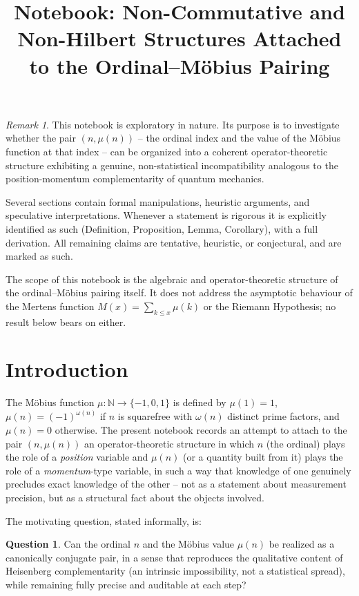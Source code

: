 \documentclass[11pt]{amsart}
\title{
Notebook:
Non-Commutative and Non-Hilbert Structures
Attached to the Ordinal--M\"obius Pairing
}
\author{}
\date{}
\numberwithin{equation}{section}
\theoremstyle{plain}
\theoremstyle{definition}
\newtheorem{question}[theorem]{Question}
\theoremstyle{remark}
\newtheorem{remark}[theorem]{Remark}
\newcommand{\N}{\mathbb{N}}
\begin{document}
\maketitle

\tableofcontents

\bigskip

\begin{remark}
\label{rem:exploratory_nature}
This notebook is exploratory in nature. Its purpose is to investigate
whether the pair $(n,\mu(n))$ -- the ordinal index and the value of
the M\"obius function at that index -- can be organized into a
coherent operator-theoretic structure exhibiting a genuine,
non-statistical incompatibility analogous to the position-momentum
complementarity of quantum mechanics.

Several sections contain formal manipulations, heuristic arguments,
and speculative interpretations. Whenever a statement is rigorous it
is explicitly identified as such (Definition, Proposition, Lemma,
Corollary), with a full derivation. All remaining claims are
tentative, heuristic, or conjectural, and are marked as such.

The scope of this notebook is the algebraic and operator-theoretic
structure of the ordinal--M\"obius pairing itself. It does not
address the asymptotic behaviour of the Mertens function $M(x)=\sum_{k\le x}\mu(k)$
or the Riemann Hypothesis; no result below bears on either.
\end{remark}

\section{Introduction}
\label{sec:introduction}

The M\"obius function $\mu:\N\to\{-1,0,1\}$ is defined by $\mu(1)=1$,
$\mu(n)=(-1)^{\omega(n)}$ if $n$ is squarefree with $\omega(n)$ distinct
prime factors, and $\mu(n)=0$ otherwise. The present notebook records
an attempt to attach to the pair $(n,\mu(n))$ an operator-theoretic
structure in which $n$ (the ordinal) plays the role of a
\emph{position} variable and $\mu(n)$ (or a quantity built from it)
plays the role of a \emph{momentum}-type variable, in such a way that
knowledge of one genuinely precludes exact knowledge of the other --
not as a statement about measurement precision, but as a structural
fact about the objects involved.

The motivating question, stated informally, is:

\begin{question}
\label{q:motivating}
Can the ordinal $n$ and the M\"obius value $\mu(n)$ be realized as a
canonically conjugate pair, in a sense that reproduces the qualitative
content of Heisenberg complementarity (an intrinsic impossibility, not
a statistical spread), while remaining fully precise and auditable at
each step?
\end{question}
\end{document}
